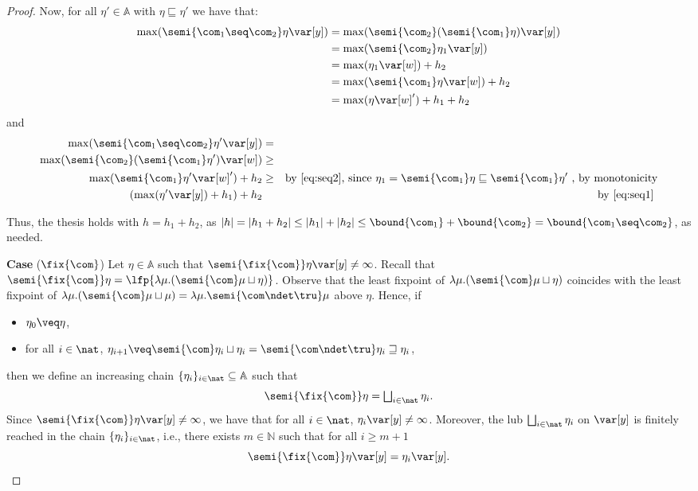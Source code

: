 \begin{proof}
  Now, for all \(\eta' \in \mathbb{A}\) with \(\eta \sqsubseteq \eta'\) we have that:
  \begin{align*}
    \max(\semi{\com_1 \seq \com_2}\eta \var[y])
    &= \max(\semi{\com_2}(\semi{\com_1}\eta) \var[y])\\
    & = \max(\semi{\com_2}\eta_1 \var[y])\\
    & = \max(\eta_1 \var[w]) + h_2\\
    & = \max(\semi{\com_1}\eta \var[w]) + h_2\\
    &= \max(\eta \var[w]')+h_1 + h_2
  \end{align*}
  and
  \begin{align*}
    \max(\semi{\com_1 \seq \com_2}\eta' \var[y]) & = & \\ 
    \max(\semi{\com_2}(\semi{\com_1}\eta') \var[w]) & \geq & \\ 
    \max(\semi{\com_1}\eta' \var[w]') + h_2 & \geq & 
    \text{by \eqref{eq:seq2}, since } \eta_1 = \semi{\com_1}\eta \sqsubseteq \semi{\com_1}\eta' \text{ , by monotonicity} \\
    (\max(\eta' \var[y]) +h_1) + h_2 & & \text{by \eqref{eq:seq1}}\
  \end{align*}

  Thus, the thesis holds with \(h= h_1+h_2\), as
  \(|h| =|h_1 +h_2| \leq |h_1| + |h_2| \leq \bound{\com_1} +
  \bound{\com_2} = \bound{\com_1 \seq \com_2}\), as needed.



  
  \medskip
  
  \noindent
  \textbf{Case} (\(\fix{\com}\)) 
  Let \(\eta \in \mathbb{A}\) such that
  \(\semi{\fix{\com}} \eta \var[y] \neq \infty\). Recall that
  \(\semi{\fix{\com}} \eta = \lfp{\lambda \mu. (\semi{\com}
    \mu \sqcup\eta)}\). Observe that the least fixpoint of
  \(\lambda \mu. (\semi{\com}
  \mu \sqcup\eta)\) coincides with the least
  fixpoint of
  \(\lambda \mu. (\semi{\com} \mu  \sqcup \mu) = \lambda \mu. \semi{ \com\ndet \tru} \mu\) above \(\eta\). Hence, if
  \begin{itemize}
  \item \(\eta_0 \veq \eta\),
  \item for all \(i\in \nat\),
    \(\eta_{i+1} \veq \semi{\com} \eta_i \sqcup \eta_i= \semi{\com \ndet
    \tru} \eta_i \sqsupseteq \eta_i\),
  \end{itemize}
  then we define an increasing chain \(\{\eta_i\}_{i\in \nat}\subseteq \mathbb{A}\) such that
  \[ 
  \semi{\fix{\com}} \eta = \textstyle\bigsqcup_{i \in \nat} \eta_i.
  \]
  Since \(\semi{\fix{\com}} \eta \var[y] \neq \infty\), we have that for
  all \(i\in \nat\), \(\eta_i \var[y] \neq \infty\). Moreover, the lub
  \(\textstyle\bigsqcup_{i \in \nat} \eta_i\) on \(\var[y]\) is finitely
  reached in the chain \(\{\eta_i\}_{i\in \nat}\), i.e., there exists
  \(m \in \mathbb{N}\) such that for all \(i \geq m+1\)
  \[
  \semi{\fix{\com}} \eta \var[y] = \eta_{i} \var[y].
  \]


\end{proof}
